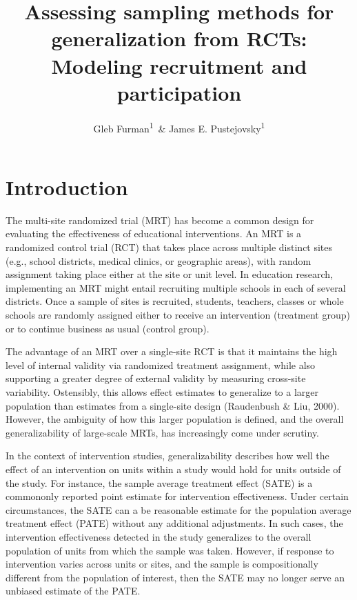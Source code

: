 \documentclass[man,floatsintext]{apa6}
\title{Assessing sampling methods for generalization from RCTs: Modeling recruitment and participation}
\author{Gleb Furman\textsuperscript{1}~\& James E. Pustejovsky\textsuperscript{1}}
\date{}
\affiliation{
\vspace{0.5cm}
\textsuperscript{1} University of Texas at Austin}
\begin{document}
\maketitle

\hypertarget{introduction}{%
\section{Introduction}\label{introduction}}

The multi-site randomized trial (MRT) has become a common design for evaluating the effectiveness of educational interventions. An MRT is a randomized control trial (RCT) that takes place across multiple distinct sites (e.g., school districts, medical clinics, or geographic areas), with random assignment taking place either at the site or unit level. In education research, implementing an MRT might entail recruiting multiple schools in each of several districts. Once a sample of sites is recruited, students, teachers, classes or whole schools are randomly assigned either to receive an intervention (treatment group) or to continue business as usual (control group).

The advantage of an MRT over a single-site RCT is that it maintains the high level of internal validity via randomized treatment assignment, while also supporting a greater degree of external validity by measuring cross-site variability. Ostensibly, this allows effect estimates to generalize to a larger population than estimates from a single-site design (Raudenbush \& Liu, 2000). However, the ambiguity of how this larger population is defined, and the overall generalizability of large-scale MRTs, has increasingly come under scrutiny.

In the context of intervention studies, generalizability describes how well the effect of an intervention on units within a study would hold for units outside of the study. For instance, the sample average treatment effect (SATE) is a commononly reported point estimate for intervention effectiveness. Under certain circumstances, the SATE can a be reasonable estimate for the population average treatment effect (PATE) without any additional adjustments. In such cases, the intervention effectiveness detected in the study generalizes to the overall population of units from which the sample was taken. However, if response to intervention varies across units or sites, and the sample is compositionally different from the population of interest, then the SATE may no longer serve an unbiased estimate of the PATE.
\end{document}
